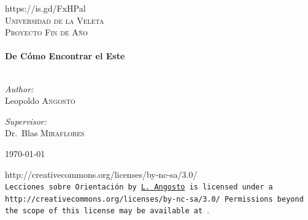 \begin{titlepage}

\begin{center}

      {https://is.gd/FxHPal}\\[1cm]    

\textsc{\LARGE Universidad de la Veleta}\\[1.5cm]

\textsc{\Large Proyecto Fin de Año}\\[0.5cm]


\HRule \\[0.4cm]
{\huge\bfseries De Cómo Encontrar el Este}\\[0.4cm]

\HRule \\[1.5cm]

\begin{minipage}{0.4\textwidth}
\begin{flushleft} \large
\emph{Author:}\\
Leopoldo \textsc{Angosto}
\end{flushleft}
\end{minipage}
\begin{minipage}{0.4\textwidth}
\begin{flushright} \large
\emph{Supervisor:} \\
Dr.~Blas \textsc{Miraflores}
\end{flushright}
\end{minipage}

\vfill

{\large \today}

\vspace{5mm}

      {http://creativecommons.org/licenses/by-nc-sa/3.0/}\\
      \texttt{Lecciones sobre Orientación by 
      \href{mailto:mi_direccion@hotmail.com}{L. Angosto}
      is licensed under a 
      {http://creativecommons.org/licenses/by-nc-sa/3.0/}
      Permissions beyond the scope of this license may be available at
      }.

\end{center}

\end{titlepage}